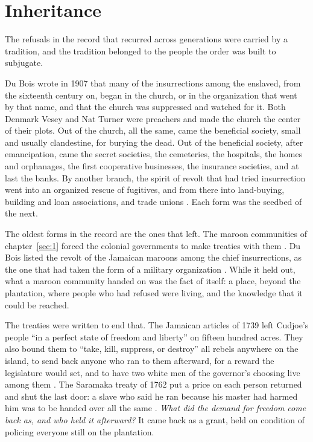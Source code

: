 \section{Inheritance}
\label{sec:reproduced.inheritance}
The refusals in the record that recurred across generations were carried by a tradition, and the tradition belonged to the people the order was built to subjugate.

Du Bois wrote in 1907 that many of the insurrections among the enslaved, from the sixteenth century on, began in the church, or in the organization that went by that name, and that the church was suppressed and watched for it. Both Denmark Vesey and Nat Turner were preachers and made the church the center of their plots. Out of the church, all the same, came the beneficial society, small and usually clandestine, for burying the dead. Out of the beneficial society, after emancipation, came the secret societies, the cemeteries, the hospitals, the homes and orphanages, the first cooperative businesses, the insurance societies, and at last the banks. By another branch, the spirit of revolt that had tried insurrection went into an organized rescue of fugitives, and from there into land-buying, building and loan associations, and trade unions \autocite[24–26]{dubois1907economic}. Each form was the seedbed of the next.

The oldest forms in the record are the ones that left. The maroon communities of chapter~\ref{sec:1} forced the colonial governments to make treaties with them \autocite{price1996maroon}. Du Bois listed the revolt of the Jamaican maroons among the chief insurrections, as the one that had taken the form of a military organization \autocite[25]{dubois1907economic}. While it held out, what a maroon community handed on was the fact of itself: a place, beyond the plantation, where people who had refused were living, and the knowledge that it could be reached.

The treaties were written to end that. The Jamaican articles of 1739 left Cudjoe's people “in a perfect state of freedom and liberty” on fifteen hundred acres. They also bound them to “take, kill, suppress, or destroy” all rebels anywhere on the island, to send back anyone who ran to them afterward, for a reward the legislature would set, and to have two white men of the governor's choosing live among them \autocite{jamaica1739articles}. The Saramaka treaty of 1762 put a price on each person returned and shut the last door: a slave who said he ran because his master had harmed him was to be handed over all the same \autocite{arends1762saramaka}. \emph{What did the demand for freedom come back as, and who held it afterward?} It came back as a grant, held on condition of policing everyone still on the plantation.

